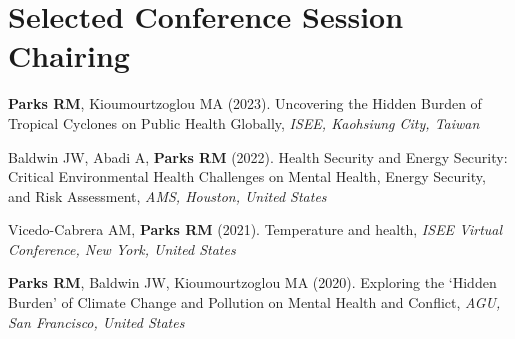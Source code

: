 \section*{Selected Conference Session Chairing}


\noindent \textbf{Parks RM},  Kioumourtzoglou MA (2023). Uncovering the Hidden Burden of Tropical Cyclones on Public Health Globally, \textit{ISEE, Kaohsiung City, Taiwan} \bigskip

\noindent Baldwin JW,  Abadi A, \textbf{Parks RM} (2022). Health Security and Energy Security: Critical Environmental Health Challenges on Mental Health, Energy Security, and Risk Assessment, \textit{AMS, Houston, United States} \bigskip

\noindent Vicedo-Cabrera AM, \textbf{Parks RM} (2021). Temperature and health, \textit{ISEE Virtual Conference, New York, United States} \bigskip

\noindent \textbf{Parks RM}, Baldwin JW,  Kioumourtzoglou MA (2020). Exploring the ‘Hidden Burden’ of Climate Change and Pollution on Mental Health and Conflict, \textit{AGU, San Francisco, United States} \bigskip

